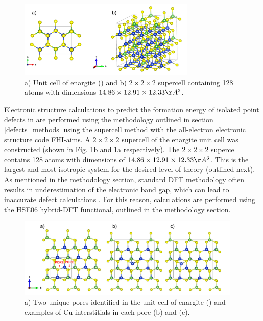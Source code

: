 \documentclass[11pt, twoside]{report}
\begin{document}
\begin{figure}[h!]
    \centering
    \includegraphics[width=0.75\textwidth]{figures/enargite_supercell.png}
    \caption{a) Unit cell of enargite ({\enargite}) and b) $2\times2\times2$ supercell containing 128 atoms with dimensions $14.86\times12.91\times12.33 \AA^3$.}
    \label{enargite_supercell}
\end{figure}

Electronic structure calculations to predict the formation energy of isolated point defects in {\enargite} are performed using the methodology outlined in section \ref{defects_methods} using the supercell method with the all-electron electronic structure code FHI-aims. A $2\times2\times2$ supercell of the enargite unit cell was constructed (shown in Fig. \ref{enargite_supercell}b and \ref{enargite_supercell}a respectively). The $2\times2\times2$ supercell contains 128 atoms with dimensions of $14.86\times12.91\times12.33 \AA^3$. This is the largest and most isotropic system for the desired level of theory (outlined next). As mentioned in the methodology section, standard DFT methodology often results in underestimation of the electronic band gap, which can lead to inaccurate defect calculations \cite{Lany_defects}. For this reason, calculations are performed using the HSE06 hybrid-DFT functional, outlined in the methodology section.

\begin{figure}[h!]
    \centering
    \includegraphics[width=0.95\textwidth]{figures/enargite_interstitials.png}
    \caption{a) Two unique pores identified in the unit cell of enargite ({\enargite}) and examples of Cu interstitials in each pore (b) and (c).}
    \label{enargite_interstitials}
\end{figure}
\end{document}
